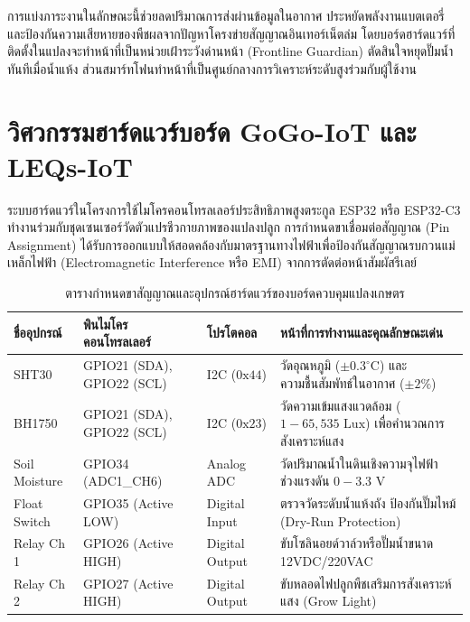 การแบ่งภาระงานในลักษณะนี้ช่วยลดปริมาณการส่งผ่านข้อมูลในอากาศ ประหยัดพลังงานแบตเตอรี่ และป้องกันความเสียหายของพืชผลจากปัญหาโครงข่ายสัญญาณอินเทอร์เน็ตล่ม โดยบอร์ดฮาร์ดแวร์ที่ติดตั้งในแปลงจะทำหน้าที่เป็นหน่วยเฝ้าระวังด่านหน้า (Frontline Guardian) ตัดสินใจหยุดปั๊มน้ำทันทีเมื่อน้ำแห้ง ส่วนสมาร์ทโฟนทำหน้าที่เป็นศูนย์กลางการวิเคราะห์ระดับสูงร่วมกับผู้ใช้งาน

\section{วิศวกรรมฮาร์ดแวร์บอร์ด GoGo-IoT และ LEQs-IoT}

ระบบฮาร์ดแวร์ในโครงการใช้ไมโครคอนโทรลเลอร์ประสิทธิภาพสูงตระกูล ESP32 หรือ ESP32-C3 ทำงานร่วมกับชุดเซนเซอร์วัดตัวแปรชีวกายภาพของแปลงปลูก การกำหนดขาเชื่อมต่อสัญญาณ (Pin Assignment) ได้รับการออกแบบให้สอดคล้องกับมาตรฐานทางไฟฟ้าเพื่อป้องกันสัญญาณรบกวนแม่เหล็กไฟฟ้า (Electromagnetic Interference หรือ EMI) จากการตัดต่อหน้าสัมผัสรีเลย์

\begin{table}[H]
\centering
\caption{ตารางกำหนดขาสัญญาณและอุปกรณ์ฮาร์ดแวร์ของบอร์ดควบคุมแปลงเกษตร}
\label{tab:hardware_pinout_mapping}
\begin{tabularx}{\textwidth}{p{2.8cm}p{3.2cm}p{2.5cm}Y}
\toprule
\textbf{ชื่ออุปกรณ์} & \textbf{พินไมโครคอนโทรลเลอร์} & \textbf{โปรโตคอล} & \textbf{หน้าที่การทำงานและคุณลักษณะเด่น} \\
\midrule
SHT30 & GPIO21 (SDA), GPIO22 (SCL) & I2C ($0\text{x}44$) & วัดอุณหภูมิ ($\pm 0.3^\circ\text{C}$) และความชื้นสัมพัทธ์ในอากาศ ($\pm 2\%$) \\
BH1750 & GPIO21 (SDA), GPIO22 (SCL) & I2C ($0\text{x}23$) & วัดความเข้มแสงแวดล้อม ($1 - 65,535\text{ Lux}$) เพื่อคำนวณการสังเคราะห์แสง \\
Soil Moisture & GPIO34 (ADC1\_CH6) & Analog ADC & วัดปริมาณน้ำในดินเชิงความจุไฟฟ้า ช่วงแรงดัน $0 - 3.3\text{ V}$ \\
Float Switch & GPIO35 (Active LOW) & Digital Input & ตรวจวัดระดับน้ำแห้งถัง ป้องกันปั๊มไหม้ (Dry-Run Protection) \\
Relay Ch 1 & GPIO26 (Active HIGH) & Digital Output & ขับโซลินอยด์วาล์วหรือปั๊มน้ำขนาด 12VDC/220VAC \\
Relay Ch 2 & GPIO27 (Active HIGH) & Digital Output & ขับหลอดไฟปลูกพืชเสริมการสังเคราะห์แสง (Grow Light) \\
\bottomrule
\end{tabularx}
\end{table}

